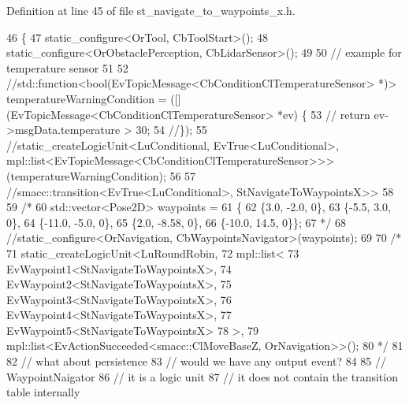 Definition at line 45 of file st\+\_\+navigate\+\_\+to\+\_\+waypoints\+\_\+x.\+h.


\begin{DoxyCode}
46   \{
47     static\_configure<OrTool, CbToolStart>();
48     static\_configure<OrObstaclePerception, CbLidarSensor>();
49 
50     \textcolor{comment}{// example for temperature sensor}
51 
52     \textcolor{comment}{//std::function<bool(EvTopicMessage<CbConditionClTemperatureSensor> *)> temperatureWarningCondition =
       ([](EvTopicMessage<CbConditionClTemperatureSensor> *ev) \{}
53     \textcolor{comment}{//  return ev->msgData.temperature > 30;}
54     \textcolor{comment}{//\});}
55     \textcolor{comment}{//static\_createLogicUnit<LuConditional, EvTrue<LuConditional>,
       mpl::list<EvTopicMessage<CbConditionClTemperatureSensor>>>(temperatureWarningCondition);}
56 
57     \textcolor{comment}{//smacc::transition<EvTrue<LuConditional>, StNavigateToWaypointsX>>}
58 
59     \textcolor{comment}{/*}
60 \textcolor{comment}{    std::vector<Pose2D> waypoints =}
61 \textcolor{comment}{        \{}
62 \textcolor{comment}{            \{3.0, -2.0, 0\},}
63 \textcolor{comment}{            \{-5.5, 3.0, 0\},}
64 \textcolor{comment}{            \{-11.0, -5.0, 0\},}
65 \textcolor{comment}{            \{2.0, -8.58, 0\},}
66 \textcolor{comment}{            \{-10.0, 14.5, 0\}\};}
67 \textcolor{comment}{*/}
68     \textcolor{comment}{//static\_configure<OrNavigation, CbWaypointsNavigator>(waypoints);}
69 
70     \textcolor{comment}{/*}
71 \textcolor{comment}{    static\_createLogicUnit<LuRoundRobin, }
72 \textcolor{comment}{                              mpl::list<}
73 \textcolor{comment}{                                   EvWaypoint1<StNavigateToWaypointsX>,}
74 \textcolor{comment}{                                   EvWaypoint2<StNavigateToWaypointsX>,}
75 \textcolor{comment}{                                   EvWaypoint3<StNavigateToWaypointsX>, }
76 \textcolor{comment}{                                   EvWaypoint4<StNavigateToWaypointsX>,}
77 \textcolor{comment}{                                   EvWaypoint5<StNavigateToWaypointsX>}
78 \textcolor{comment}{                                  >, }
79 \textcolor{comment}{                         mpl::list<EvActionSucceeded<smacc::ClMoveBaseZ, OrNavigation>>();}
80 \textcolor{comment}{                         */}
81 
82     \textcolor{comment}{// what about persistence}
83     \textcolor{comment}{// would we have any output event?}
84 
85     \textcolor{comment}{// WaypointNaigator}
86     \textcolor{comment}{// it is a logic unit}
87     \textcolor{comment}{// it does not contain the transition table internally}

\end{DoxyCode}
